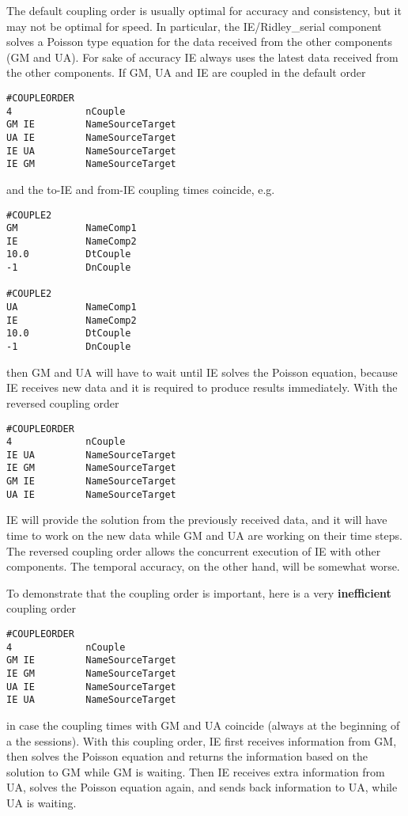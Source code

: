 The default coupling order is usually optimal for accuracy
and consistency, but it may not be optimal for speed.
In particular, the IE/Ridley\_serial component solves
a Poisson type equation for the data received from the 
other components (GM and UA). For sake of accuracy
IE always uses the latest data received from the other
components. If GM, UA and IE are coupled
in the default order
\begin{verbatim}
#COUPLEORDER
4             nCouple	  
GM IE	      NameSourceTarget
UA IE	      NameSourceTarget
IE UA	      NameSourceTarget
IE GM	      NameSourceTarget
\end{verbatim}
and the to-IE and from-IE coupling times coincide, e.g.
\begin{verbatim}
#COUPLE2
GM            NameComp1
IE            NameComp2
10.0          DtCouple
-1            DnCouple

#COUPLE2
UA            NameComp1
IE            NameComp2
10.0          DtCouple
-1            DnCouple
\end{verbatim}
then GM and UA will have to wait until IE solves
the Poisson equation, because IE receives new data
and it is required to produce results immediately.
With the reversed coupling order
\begin{verbatim}
#COUPLEORDER
4             nCouple	  
IE UA	      NameSourceTarget
IE GM	      NameSourceTarget
GM IE	      NameSourceTarget
UA IE	      NameSourceTarget
\end{verbatim}
IE will provide the solution from the previously received data,
and it will have time to work on the new data while GM and UA
are working on their time steps. The reversed coupling order
allows the concurrent execution of IE with other components.
The temporal accuracy, on the other hand, will be somewhat worse.

To demonstrate that the coupling order is important, here
is a very {\bf inefficient} coupling order
\begin{verbatim}
#COUPLEORDER
4             nCouple	  
GM IE         NameSourceTarget
IE GM         NameSourceTarget
UA IE         NameSourceTarget
IE UA         NameSourceTarget
\end{verbatim}
in case the coupling times with GM and UA coincide (always at the beginning
of a the sessions).
With this coupling order, IE first receives information from GM,
then solves the Poisson equation and returns the information based
on the solution to GM while GM is waiting. Then IE receives extra
information from UA, solves the Poisson equation again, and sends
back information to UA, while UA is waiting. 

